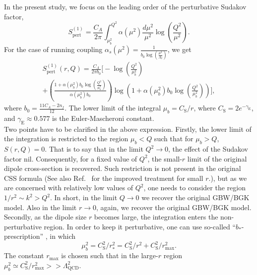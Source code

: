 \documentclass[11pt]{article}
\begin{document}
In the present study, we focus on the leading order of the perturbative Sudakov factor\cite{xiao2017},
\begin{equation}
S^{(1)}_\mathrm{pert}=\frac{C_A }{2 \pi} \int^{Q^2}_{\mu_b^2  } \alpha(\mu^2 )\frac{d \mu^2}{\mu^2}  \log\left(\frac{Q^2}{\mu^2}\right).
\end{equation}
For the case of running coupling $\alpha_s(\mu^2)=\frac{1}{b_0 \log\left(\frac{\mu^2}{\Lambda_2}\right) }$, we get
\begin{multline}
S^{(1)}_\mathrm{pert}(r,Q) =\frac{C_A}{2 \pi b_0} \Big[-\log\left(\frac{Q^2}{\mu^2_b}\right) \\+\left(\frac{1+\alpha(\mu_b^2)  b_0 \log \left(\frac{Q^2}{\mu_b^2}\right) }{\alpha(\mu_b^2)   b_0}\right) \log\left( 1+\alpha(\mu_b^2)   b_0 \log \left(\frac{Q^2}{\mu_b^2}\right) \right) \Big],
\label{eq:sudakov}
\end{multline}
where $b_0=\frac{11 C_A-2 n_f}{12}$.
The lower limit of the integral $\mu_b=C_\mathrm{S}/r$, where $C_\mathrm{S}=2e^{-\gamma_\mathrm{E}}$, and $\gamma_\mathrm{E} \approx 0.577$ is the Euler-Mascheroni constant.\\
Two points have to be clarified in the above expression.
Firstly, the lower limit of the integration is restricted to the region $\mu_b<Q$ such that for $\mu_b>Q$, $S(r,Q)=0$. That is to say that in the limit $Q^2\rightarrow0$, the effect of the Sudakov factor nil. Consequently, for a fixed value of $Q^2$, the small-$r$ limit of the original dipole cross-section is recovered.   Such restriction is not present in the original CSS formula\cite{css1985} (See also Ref.~\cite{collins2016} for the improved treatment for small $r$.), but as we are concerned with relatively low values of $Q^2$, one needs to consider the region $1/r^2\sim k^2 >Q^2$.
In short, in the limit $Q\rightarrow 0$ we recover the original GBW/BGK model. Also in the limit $r \rightarrow 0$, again,  we recover the original GBW/BGK model.
Secondly, as the dipole size $r$ becomes large, the integration enters the non-perturbative region. In order to keep it perturbative, one can use so-called ``$b_*$-prescription'' \cite{css1985}, in which 
\begin{equation}
\mu_b^2=C_\mathrm{S}^2/r_*^2= C_\mathrm{S}^2/r^2+C_\mathrm{S}^2/r_{\mathrm{max}}^2.
\end{equation}
The constant $r_{\mathrm{max}}$ is chosen such that in the large-$r$ region $\mu_b^2\simeq C_\mathrm{S}^2/r_{\mathrm{max}}^2>>\Lambda_{\mathrm{QCD}}^2$.
\end{document}
